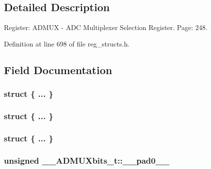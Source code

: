 \subsection{Detailed Description}
Register\+: A\+D\+M\+U\+X -\/ A\+D\+C Multiplexer Selection Register. Page\+: 248. 

Definition at line 698 of file reg\+\_\+structs.\+h.



\subsection{Field Documentation}
\hypertarget{union_____a_d_m_u_xbits__t_affdbcee10de3f324706bc3f00f374ede}{\subsubsection[{"@169}]{\setlength{\rightskip}{0pt plus 5cm}struct \{ ... \} }}\label{union_____a_d_m_u_xbits__t_affdbcee10de3f324706bc3f00f374ede}
\hypertarget{union_____a_d_m_u_xbits__t_aac5786f1af909585df74f6d54fabe42c}{\subsubsection[{"@171}]{\setlength{\rightskip}{0pt plus 5cm}struct \{ ... \} }}\label{union_____a_d_m_u_xbits__t_aac5786f1af909585df74f6d54fabe42c}
\hypertarget{union_____a_d_m_u_xbits__t_acb2f19955a752d4224b31410c1239749}{\subsubsection[{"@173}]{\setlength{\rightskip}{0pt plus 5cm}struct \{ ... \} }}\label{union_____a_d_m_u_xbits__t_acb2f19955a752d4224b31410c1239749}
\hypertarget{union_____a_d_m_u_xbits__t_ad654d8d38390c97eb1d1f925029308f8}{
\subsubsection[{\+\_\+\+\_\+pad0\+\_\+\+\_\+}]{\setlength{\rightskip}{0pt plus 5cm}unsigned \+\_\+\+\_\+\+A\+D\+M\+U\+Xbits\+\_\+t\+::\+\_\+\+\_\+pad0\+\_\+\+\_\+}}\label{union_____a_d_m_u_xbits__t_ad654d8d38390c97eb1d1f925029308f8}


